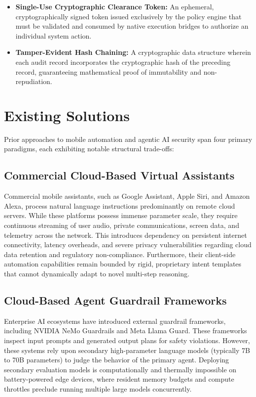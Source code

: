 \begin{itemize}
    \item \textbf{Single-Use Cryptographic Clearance Token:} An ephemeral, cryptographically signed token issued exclusively by the policy engine that must be validated and consumed by native execution bridges to authorize an individual system action.
    \item \textbf{Tamper-Evident Hash Chaining:} A cryptographic data structure wherein each audit record incorporates the cryptographic hash of the preceding record, guaranteeing mathematical proof of immutability and non-repudiation.
\end{itemize}

\section{Existing Solutions}

Prior approaches to mobile automation and agentic AI security span four primary paradigms, each exhibiting notable structural trade-offs:

\subsection{Commercial Cloud-Based Virtual Assistants}
Commercial mobile assistants, such as Google Assistant, Apple Siri, and Amazon Alexa, process natural language instructions predominantly on remote cloud servers. While these platforms possess immense parameter scale, they require continuous streaming of user audio, private communications, screen data, and telemetry across the network. This introduces dependency on persistent internet connectivity, latency overheads, and severe privacy vulnerabilities regarding cloud data retention and regulatory non-compliance. Furthermore, their client-side automation capabilities remain bounded by rigid, proprietary intent templates that cannot dynamically adapt to novel multi-step reasoning.

\subsection{Cloud-Based Agent Guardrail Frameworks}
Enterprise AI ecosystems have introduced external guardrail frameworks, including NVIDIA NeMo Guardrails and Meta Llama Guard. These frameworks inspect input prompts and generated output plans for safety violations. However, these systems rely upon secondary high-parameter language models (typically 7B to 70B parameters) to judge the behavior of the primary agent. Deploying secondary evaluation models is computationally and thermally impossible on battery-powered edge devices, where resident memory budgets and compute throttles preclude running multiple large models concurrently.

